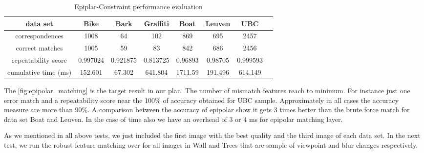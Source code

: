 \begin{table}[H]
  \begin{tabular}{| c || c | c | c | c | c | c | c |}
      \hline
      data set & Bike & Bark & Graffiti & Boat & Leuven & UBC \\ \hline \hline
      correspondences & 1008 & 64 & 102 & 869 & 695 & 2457 \\ \hline
      correct matches & 1005 & 59 & 83 & 842 & 686 & 2456 \\ \hline
      repeatability score & 0.997024 & 0.921875 & 0.813725 & 0.96893 & 0.98705 & 0.999593 \\ \hline
      cumulative time (ms) & 152.601 & 67.302 & 641.804 & 1711.59 & 191.496 & 614.149 \\ \hline
  \end{tabular}
  \caption{Epiplar-Constraint performance evaluation} \label{tab:epipolar_matching_eval}
\end{table}

The \autoref{fig:epipolar_matching} is the target result in our plan. The number of mismatch features reach to minimum. For instance just one error match and a repeatability score near the 100\% of accuracy obtained for UBC sample. Approximately in all cases the accuracy measure are more than 90\%. A comparison between the accuracy of epipolar show it gets 3 times better than the brute force match for data set Boat and Leuven. In the case of time also we have an overhead of 3 or 4 ms for epipolar matching layer.

As we mentioned in all above tests, we just included the first image with the best quality and the third image of each data set. In the next test, we run the robust feature matching over for all images in Wall and Trees that are sample of viewpoint and blur changes respectively. 

